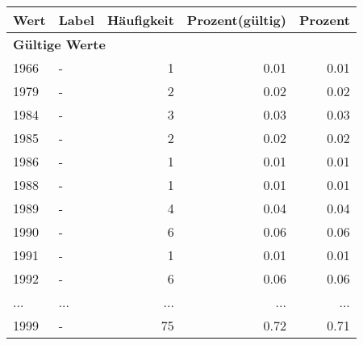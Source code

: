      \begin{longtable}{lXrrr}
     \toprule
     \textbf{Wert} & \textbf{Label} & \textbf{Häufigkeit} & \textbf{Prozent(gültig)} & \textbf{Prozent} \\
     \endhead
     \midrule
     \multicolumn{5}{l}{\textbf{Gültige Werte}}\\
        1966 & \multicolumn{1}{X}{-} & %
          \num{1} &
          \num[round-mode=places,round-precision=2]{0.01} &
          \num[round-mode=places,round-precision=2]{0.01} \\
        1979 & \multicolumn{1}{X}{-} & %
          \num{2} &
          \num[round-mode=places,round-precision=2]{0.02} &
          \num[round-mode=places,round-precision=2]{0.02} \\
        1984 & \multicolumn{1}{X}{-} & %
          \num{3} &
          \num[round-mode=places,round-precision=2]{0.03} &
          \num[round-mode=places,round-precision=2]{0.03} \\
        1985 & \multicolumn{1}{X}{-} & %
          \num{2} &
          \num[round-mode=places,round-precision=2]{0.02} &
          \num[round-mode=places,round-precision=2]{0.02} \\
        1986 & \multicolumn{1}{X}{-} & %
          \num{1} &
          \num[round-mode=places,round-precision=2]{0.01} &
          \num[round-mode=places,round-precision=2]{0.01} \\
        1988 & \multicolumn{1}{X}{-} & %
          \num{1} &
          \num[round-mode=places,round-precision=2]{0.01} &
          \num[round-mode=places,round-precision=2]{0.01} \\
        1989 & \multicolumn{1}{X}{-} & %
          \num{4} &
          \num[round-mode=places,round-precision=2]{0.04} &
          \num[round-mode=places,round-precision=2]{0.04} \\
        1990 & \multicolumn{1}{X}{-} & %
          \num{6} &
          \num[round-mode=places,round-precision=2]{0.06} &
          \num[round-mode=places,round-precision=2]{0.06} \\
        1991 & \multicolumn{1}{X}{-} & %
          \num{1} &
          \num[round-mode=places,round-precision=2]{0.01} &
          \num[round-mode=places,round-precision=2]{0.01} \\
        1992 & \multicolumn{1}{X}{-} & %
          \num{6} &
          \num[round-mode=places,round-precision=2]{0.06} &
          \num[round-mode=places,round-precision=2]{0.06} \\
       ... & ... & ... & ... & ... \\
        1999 & \multicolumn{1}{X}{-} & %
          \num{75} &
          \num[round-mode=places,round-precision=2]{0.72} &
          \num[round-mode=places,round-precision=2]{0.71} \\


\end{longtable}
